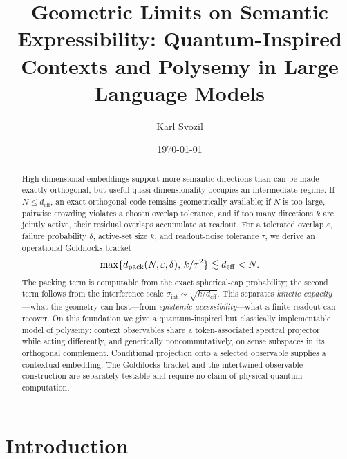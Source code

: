 \documentclass[
  aps,
  reprint,
  superscriptaddress,
  floatfix,
  nofootinbib,
  longbibliography
]{revtex4-2}
\newcommand{\deff}{d_{\mathrm{eff}}}
\newcommand{\sint}{\sigma_{\mathrm{int}}}
\begin{document}
\title{Geometric Limits on Semantic Expressibility: Quantum-Inspired Contexts and Polysemy in Large Language Models}

\author{Karl Svozil}

\date{\today}

\begin{abstract}
High-dimensional embeddings support more semantic directions than can be
made exactly orthogonal, but useful quasi-dimensionality occupies an
intermediate regime.  If $N\leq\deff$, an exact orthogonal code remains
geometrically available; if $N$ is too large, pairwise crowding violates a
chosen overlap tolerance, and if too many directions $k$ are jointly active,
their residual overlaps accumulate at readout.  For a tolerated overlap
$\varepsilon$, failure probability $\delta$, active-set size $k$, and
readout-noise tolerance $\tau$, we derive an operational Goldilocks bracket
\[
 \max\{d_{\rm pack}(N,\varepsilon,\delta),\,k/\tau^2\}
 \lesssim \deff < N .
\]
The packing term is computable from the exact spherical-cap probability; the
second term follows from the interference scale
$\sint\sim\sqrt{k/\deff}$.  This separates \emph{kinetic capacity}---what
the geometry can host---from \emph{epistemic accessibility}---what a finite
readout can recover.  On this foundation we give a quantum-inspired but
classically implementable model of polysemy: context observables share a
token-associated spectral projector while acting differently, and generically
noncommutatively, on sense subspaces in its orthogonal complement.  Conditional
projection onto a selected observable supplies a contextual embedding.  The
Goldilocks bracket and the intertwined-observable construction are separately
testable and require no claim of physical quantum computation.
\end{abstract}

\maketitle


\section{Introduction}
\label{sec:intro}
\end{document}
